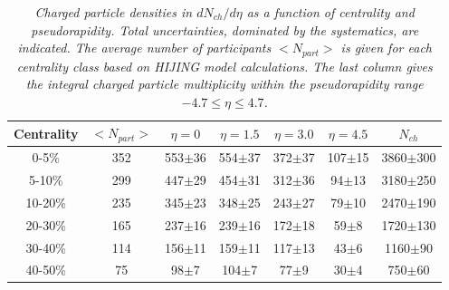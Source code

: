 \documentclass[singlespacing]{elsart}
\begin{document}
\newpage
\begin{table}[h!]
\caption{\label{TABLE}\textit{\sl Charged particle densities in
$dN_{ch}/d\eta$ as a function of
centrality and pseudorapidity. Total uncertainties, dominated by
the systematics,  are indicated. The average
number of participants $<N_{part}>$ is given for each centrality
class based on HIJING model calculations. The last column gives the
integral charged particle multiplicity within the pseudorapidity
range $-4.7 \le \eta \le 4.7$.}}
\vspace{0.5cm}
\begin{tabular}{|c|c|c|c|c|c|c|}
\hline
Centrality &
$<N_{part}>$&
$\eta = 0$ &
$\eta =1.5$ &
$\eta = 3.0$ &
$\eta = 4.5$ &
$N_{ch}$
\\
\hline
0-5\%   & 352 & 553$\pm$36 & 554$\pm$37 & 372$\pm$37 & 107$\pm$15 & 3860$\pm$300 \\
\hline
5-10\%  & 299 & 447$\pm$29 & 454$\pm$31 & 312$\pm$36 &  94$\pm$13 & 3180$\pm$250 \\
\hline
10-20\% & 235 & 345$\pm$23 & 348$\pm$25 & 243$\pm$27 &  79$\pm$10 & 2470$\pm$190 \\
\hline
20-30\% & 165 & 237$\pm$16 & 239$\pm$16 & 172$\pm$18 &  59$\pm$8  & 1720$\pm$130 \\
\hline
30-40\% & 114 & 156$\pm$11 & 159$\pm$11 & 117$\pm$13 &  43$\pm$6  & 1160$\pm$90  \\
\hline
40-50\% &  75 &  98$\pm$7   & 104$\pm$7  & 77$\pm$9   &  30$\pm$4 &  750$\pm$60 \\
\hline
\end{tabular}
\end{table}
\end{document}
